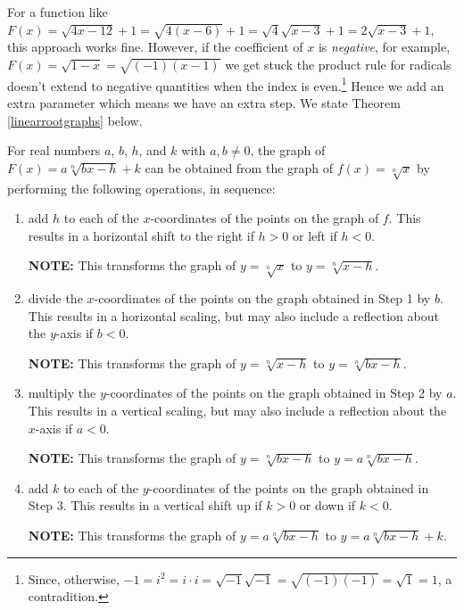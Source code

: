 \documentclass{ximera}
\begin{document}
For a function like $F(x) = \sqrt{4x-12} + 1 = \sqrt{4(x-6)} + 1 = \sqrt{4}\sqrt{x-3} + 1 = 2 \sqrt{x-3} + 1$, this approach works fine.   However, if the coefficient of $x$ is \textit{negative},   for example, $F(x) = \sqrt{1-x} = \sqrt{(-1)(x-1)}$ we get stuck the product rule for radicals doesn't extend to negative quantities when the index is even.\footnote{Since, otherwise, $-1 = i^2 = i \cdot i = \sqrt{-1}\sqrt{-1} = \sqrt{(-1)(-1)} = \sqrt{1} = 1$, a contradition.}   Hence we add an extra parameter which means we have an extra step.  We state Theorem \ref{linearrootgraphs} below.



\begin{theorem} \label{linearrootgraphs}  For real numbers $a$, $b$, $h$, and $k$ with $a, b \neq 0$, the graph of $F(x) = a\sqrt[n]{bx-h} +k$  can be obtained from the graph of $f(x) = \sqrt[n]{x}$ by performing the following operations, in sequence:


\begin{enumerate}

\item  add $h$ to each of the $x$-coordinates of the points on the graph of $f$.  This results in a horizontal shift to the right if $h > 0$ or left if $h < 0$.

\textbf{NOTE:}  This transforms the graph of $y = \sqrt[n]{x}$ to $y = \sqrt[n]{x-h}$.

\item  divide the $x$-coordinates of the points on the graph obtained in Step 1 by $b$.  This results in a horizontal scaling, but may also include a reflection about the $y$-axis if $b < 0$.

\textbf{NOTE:}  This transforms the graph of $y = \sqrt[n]{x-h}$ to $y = \sqrt[n]{bx-h}$.

\item  multiply the $y$-coordinates of the points on the graph obtained in Step 2 by $a$.   This results in a vertical scaling, but may also include a reflection about the $x$-axis if $a < 0$.

\textbf{NOTE:}  This transforms the graph of $y = \sqrt[n]{bx-h}$ to $y = a\sqrt[n]{bx-h}$.

\item  add $k$ to each of the $y$-coordinates of the points on the graph obtained in Step 3.  This results in a vertical shift up if $k > 0$ or down if $k< 0$.

\textbf{NOTE:}  This transforms the graph of $y = a\sqrt[n]{bx-h}$ to $y = a\sqrt[n]{bx-h} + k$.

\end{enumerate}


\end{theorem}
\end{document}
